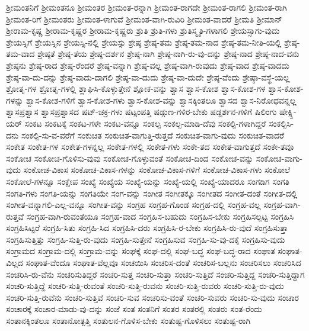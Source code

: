 {ಶ್ರೀಮಂತನಿಗೆ
ಶ್ರೀಮಂತನೂ
ಶ್ರೀಮಂತರ
ಶ್ರೀಮಂತ-ರನ್ನಾಗಿ
ಶ್ರೀಮಂತ-ರಾಗದೇ
ಶ್ರೀಮಂತ-ರಾಗಲಿ
ಶ್ರೀಮಂತ-ರಾಗಿ
ಶ್ರೀಮಂತ-ರಿಗೆ
ಶ್ರೀಮಂತರು
ಶ್ರೀಮಂತ-ಳಾಗುವೆ
ಶ್ರೀಮಂತ-ವಾಗಿ-ರುವಿರಿ
ಶ್ರೀಮಂತ-ವಾದರೆ
ಶ್ರೀಮತಿ
ಶ್ರೀಮಾನ್
ಶ್ರೀರಾಮ-ಕೃಷ್ಣ
ಶ್ರೀರಾಮ-ಕೃಷ್ಣರ
ಶ್ರೀರಾಮ-ಕೃಷ್ಣರು
ಶ್ರುತಿ
ಶ್ರುತಿ-ಗಳು
ಶ್ರುತಿಸ್ಮೃತಿ-ಗಳಾಗಲಿ
ಶ್ರೇಯಸ್ಸಾಗು-ವುದು
ಶ್ರೇಯಸ್ಸಿಗೆ
ಶ್ರೇಯಸ್ಸಿನ
ಶ್ರೇಯಸ್ಸಿ-ನಲ್ಲಿ
ಶ್ರೇಯಸ್ಸು
ಶ್ರೇಷ್ಠ
ಶ್ರೇಷ್ಠ-ತಮ
ಶ್ರೇಷ್ಠ-ತಮ-ನಾದ
ಶ್ರೇಷ್ಠ-ತಮ-ನೀತಿ-ಯಲ್ಲಿ
ಶ್ರೇಷ್ಠ-ತಮ-ವಾದ
ಶ್ರೇಷ್ಠತೆ
ಶ್ರೇಷ್ಠ-ತೆಯ
ಶ್ರೇಷ್ಠ-ದರ್ಶನ
ಶ್ರೇಷ್ಠ-ನಾಗಿ
ಶ್ರೇಷ್ಠ-ನಾಗಿ-ರು-ವು-ದನ್ನು
ಶ್ರೇಷ್ಠ-ನಾದ
ಶ್ರೇಷ್ಠ-ನಾದ-ವನು
ಶ್ರೇಷ್ಠನು
ಶ್ರೇಷ್ಠ-ರಾದ
ಶ್ರೇಷ್ಠ-ರೆಂದರೆ
ಶ್ರೇಷ್ಠ-ವನ್ನಾಗಿ
ಶ್ರೇಷ್ಠ-ವಲ್ಲ
ಶ್ರೇಷ್ಠ-ವಾಗಿ-ರುವುದು
ಶ್ರೇಷ್ಠ-ವಾದ
ಶ್ರೇಷ್ಠ-ವಾದದು
ಶ್ರೇಷ್ಠ-ವಾ-ದು-ದನ್ನು
ಶ್ರೇಷ್ಠ-ವಾದು-ದಾಗಲಿ
ಶ್ರೇಷ್ಠ-ವಾ-ದುದು
ಶ್ರೇಷ್ಠ-ವಾ-ದುದೇ
ಶ್ರೇಷ್ಠ-ವೆಂದು
ಶ್ರೇಷ್ಠಾ-ವಸ್ಥೆ-ಯಲ್ಲ
ಶ್ರೋತೃ-ಗಳ
ಶ್ರೋತೃ-ಗಳಲ್ಲಿ
ಶ್ಲಾಘಿಸಿ-ಕೊಳ್ಳುತ್ತೇನೆ
ಶ್ಲೋಕ-ವನ್ನು
ಶ್ವಾಸ
ಶ್ವಾಸ-ಕೋಶ
ಶ್ವಾಸ-ಕೋಶ-ಗಳ
ಶ್ವಾಸ-ಕೋಶ-ಗಳನ್ನು
ಶ್ವಾಸ-ಕೋಶ-ಗಳಿಗೆ
ಶ್ವಾಸ-ಕೋಶ-ಗಳು
ಶ್ವಾಸ-ಕೋಶ-ವನ್ನು
ಶ್ವಾಸಕ್ಕಿಂತಲೂ
ಶ್ವಾಸದ
ಶ್ವಾಸ-ನಿರೋಧವನ್ನಲ್ಲ
ಶ್ವಾಸಪ್ರಶ್ವಾಸ
ಶ್ವಾಸಪ್ರಶ್ವಾಸದ
ಷಟ್-ಚಕ್ರ-ಗಳು
ಷಟ್ಸಂಪತ್ತಿ
ಷಡ್ಗುಣ-ಗಳಿರ-ಬೇಕು
ಷಡ್ದರ್ಶನ-ಗಳಿಗೆ
ಷಿಲಿಂಗು
ಷೇಕ್ಸ್ಪಿ-ಯರ್
ಸಂಕಟ
ಸಂಕಟಕ್ಕೆ
ಸಂಕಟ-ಗಳೇ
ಸಂಕಟ-ವನ್ನೂ
ಸಂಕಲ್ಪ
ಸಂಕಲ್ಪ-ಮಾಡಿ-ದೆವು
ಸಂಕಲ್ಪಿ-ಗಳಾಗಿದ್ದರೆ
ಸಂಕಲ್ಪಿಸಿ-ದನು
ಸಂಕಲ್ಪಿ-ಸು-ವ-ವರೆಗೆ
ಸಂಕುಚಿತ
ಸಂಕುಚಿತ-ವಾಗುತ್ತಿ-ರುತ್ತದೆ
ಸಂಕುಚಿತ-ವಾಗು-ವುದು
ಸಂಕುಚಿತ-ವಾದರೆ
ಸಂಕೇತ
ಸಂಕೇತ-ಗಳ
ಸಂಕೇತ-ಗಳನ್ನಲ್ಲ
ಸಂಕೇತ-ಗಳಲ್ಲಿ
ಸಂಕೇತ-ಗಳು
ಸಂಕೇ-ತದ
ಸಂಕೇತ-ವಾಗುತ್ತದೆ
ಸಂಕೇ-ತವೂ
ಸಂಕೋಚ
ಸಂಕೋಚ-ಗೊಳಿಸು-ವುವು
ಸಂಕೋಚ-ಗೊಳ್ಳುವಂತೆ
ಸಂಕೋಚ-ದಿಂದ
ಸಂಕೋಚ-ವನ್ನು
ಸಂಕೋಚ-ವಾಗು-ವುದು
ಸಂಕೋಚ-ವಿಕಾಸ
ಸಂಕೋಚ-ವಿಕಾಸ-ಗಳನ್ನು
ಸಂಕೋಚ-ವಿಕಾಸ-ಗಳಿಗೆ
ಸಂಕೋಚ-ವಿಕಾಸ-ಗಳು
ಸಂಕೋಲೆ
ಸಂಕೋಲೆ-ಗಳನ್ನೂ
ಸಂಕ್ಷೇಪ
ಸಂಖ್ಯೆ
ಸಂಖ್ಯೆಯ
ಸಂಖ್ಯೆ-ಯನ್ನು
ಸಂಖ್ಯೆ-ಯಲ್ಲಿ
ಸಂಖ್ಯೆ-ಯಾದರೂ
ಸಂಗಡಿಗ
ಸಂಗತಿ
ಸಂಗತಿ-ಗಳು
ಸಂಗತಿ-ಯನ್ನು
ಸಂಗತಿಯೇ
ಸಂಗ-ವನ್ನು
ಸಂಗೀತ
ಸಂಗೀತಕ್ಕೂ
ಸಂಗೀತದ
ಸಂಗೀತ-ದಂತೆ
ಸಂಗೀತ-ದಲ್ಲಿ
ಸಂಗೀತ-ವನ್ನಾಗಲಿ-ಎಲ್ಲ-ವನ್ನೂ
ಸಂಗೀತ-ವನ್ನು
ಸಂಗ್ರಹ
ಸಂಗ್ರಹ-ಗೊಂಡ
ಸಂಗ್ರಹ-ದಲ್ಲಿ
ಸಂಗ್ರಹ-ವಲ್ಲ
ಸಂಗ್ರಹ-ವಾಗಿ-ರುತ್ತವೆ
ಸಂಗ್ರಹ-ವಾಗಿ-ರುವಂತೆಯೂ
ಸಂಗ್ರಹ-ವಾದ
ಸಂಗ್ರಹಿಸ-ಬಹುದು
ಸಂಗ್ರಹಿಸ-ಬೇಕು
ಸಂಗ್ರಹಿಸಲ್ಪಟ್ಟ
ಸಂಗ್ರಹಿಸಿ
ಸಂಗ್ರಹಿಸಿಟ್ಟರೆ
ಸಂಗ್ರಹಿ-ಸಿತು
ಸಂಗ್ರಹಿ-ಸಿದ
ಸಂಗ್ರಹಿಸಿ-ದರು
ಸಂಗ್ರಹಿಸಿ-ರ-ಬೇಕು
ಸಂಗ್ರಹಿಸಿ-ರು-ವುದೆ
ಸಂಗ್ರಹಿಸುತ್ತಾ
ಸಂಗ್ರಹಿಸುತ್ತಿತ್ತು
ಸಂಗ್ರಹಿ-ಸುತ್ತಿ-ರು-ವುದು
ಸಂಗ್ರಹಿ-ಸುತ್ತೇನೆ
ಸಂಗ್ರಹಿಸುವ
ಸಂಗ್ರಹಿ-ಸು-ವು-ದಕ್ಕೆ
ಸಂಗ್ರಹಿಸು-ವುದು
ಸಂಗ್ರಾಮದ
ಸಂಗ್ರಾಮ-ದಲ್ಲಿ
ಸಂಗ್ರಾಮ-ವನ್ನು
ಸಂಘಕ್ಕೆ
ಸಂಘ-ದಲ್ಲಿ
ಸಂಘ-ಬದ್ಧ
ಸಂಘ-ಬದ್ಧ-ರಾದ
ಸಂಘಾತ
ಸಂಘಾತ-ವಿಲ್ಲದ
ಸಂಘಾತ-ವೆಂದೂ
ಸಂಘಾತ-ವೆಲ್ಲವೂ
ಸಂಚಯಿಸಿ
ಸಂಚರಿಸ-ದಂತೆ
ಸಂಚರಿಸ-ಬಲ್ಲನು
ಸಂಚರಿಸಲು
ಸಂಚರಿಸಿದ
ಸಂಚರಿಸಿ-ರು-ವೆನು
ಸಂಚರಿಸುತಿದ್ದರೆ
ಸಂಚರಿ-ಸುತ್ತ
ಸಂಚರಿ-ಸುತ್ತಾ
ಸಂಚರಿ-ಸುತ್ತಿದೆ
ಸಂಚರಿ-ಸುತ್ತಿದ್ದ
ಸಂಚರಿ-ಸುತ್ತಿದ್ದಾಗ
ಸಂಚರಿ-ಸುತ್ತಿದ್ದೆ
ಸಂಚರಿ-ಸುತ್ತಿ-ರುವಂತೆ
ಸಂಚರಿ-ಸುತ್ತಿ-ರುವನು
ಸಂಚರಿ-ಸುತ್ತಿ-ರುವರು
ಸಂಚರಿ-ಸುತ್ತಿ-ರು-ವುದು
ಸಂಚರಿ-ಸುತ್ತಿ-ರುವೆನು
ಸಂಚರಿ-ಸುತ್ತಿವೆ
ಸಂಚರಿ-ಸುವ
ಸಂಚರಿಸು-ವಂತೆ
ಸಂಚರಿ-ಸುವರು
ಸಂಚರಿ-ಸು-ವುದು
ಸಂಚಾರ
ಸಂಚಾರಕ್ಕೆ
ಸಂಚಾರ-ಮಾಡು-ವು-ದನ್ನು
ಸಂಜೆ
ಸಂತ
ಸಂತನಿಗೆ
ಸಂತರ
ಸಂತರಲ್ಲಿ
ಸಂತರು
ಸಂತ-ರೆಂದು
ಸಂತಾನಕ್ಕಿಂತಲೂ
ಸಂತಾನೋತ್ಪತ್ತಿ
ಸಂತುಲನ-ಗೊಳಿಸ-ಬೇಕು
ಸಂತುಷ್ಟ-ಗೊಳಿಸಲು
ಸಂತುಷ್ಟ-ರಾಗಿ
}
